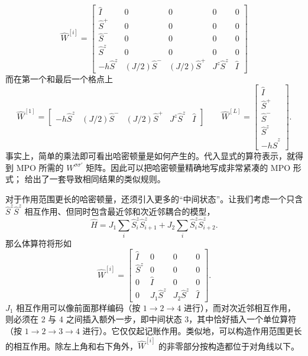 \documentclass[a4paper,10pt,oneside,onecolumn,1p,times]{elsarticle}
\begin{document}
\begin{equation}
\hat{W}^{[i]} = \left[
\begin{array}{ccccc}
\hat{I} & 0 & 0 & 0 & 0 \\
\hat{S}^+ & 0 & 0 & 0 & 0 \\
\hat{S}^- & 0 & 0 & 0 & 0 \\
\hat{S}^z & 0 & 0 & 0 & 0 \\
-h\hat{S}^z & (J/2)\hat{S}^- & (J/2)\hat{S}^+ & J^z\hat{S}^z & \hat{I}
\end{array}
\right]
\end{equation}
而在第一个和最后一个格点上
\begin{equation}
\hat{W}^{[1]} = \left[
\begin{array}{ccccc}
-h\hat{S}^z & (J/2)\hat{S}^- & (J/2)\hat{S}^+ & J^z\hat{S}^z & \hat{I} 
\end{array}
\right]
\quad\quad 
\hat{W}^{[L]} = \left[
\begin{array}{c}
\hat{I} \\ \hat{S}^+ \\ \hat{S}^- \\ \hat{S}^z \\ -h\hat{S}^z 
\end{array}
\right] .
\end{equation}
事实上，简单的乘法即可看出哈密顿量是如何产生的。代入显式的算符表示，就得到 MPO 所需的 $W^{\sigma\sigma'}$ 矩阵。因此可以把哈密顿量精确地写成非常紧凑的 MPO 形式；\cite{Crosswhite08a} 给出了一套导致相同结果的类似规则。

对于作用范围更长的哈密顿量，还须引入更多的``中间状态''。让我们考虑一个只含 $\hat{S}^z \hat{S}^z$ 相互作用、但同时包含最近邻和次近邻耦合的模型，
\begin{equation}
\hat{H} = J_1 \sum_{i} \hat{S}^z_i \hat{S}^z_{i+1} + J_2 \sum_{i} \hat{S}^z_i \hat{S}^z_{i+2} .
\end{equation}
那么体算符将形如
\begin{equation}
\hat{W}^{[i]} = \left[
\begin{array}{cccc}
\hat{I} & 0 & 0 & 0 \\
\hat{S}^z & 0 & 0 & 0 \\
0 & \hat{I} & 0 & 0 \\
0 & J_1\hat{S}^z & J_2\hat{S}^z & \hat{I}
\end{array}
\right] .
\end{equation}
$J_1$ 相互作用可以像前面那样编码（按 $1 \rightarrow 2 \rightarrow 4$ 进行），而对次近邻相互作用，则必须在 2 与 4 之间插入额外一步，即中间状态 3，其中恰好插入一个单位算符（按 $1 \rightarrow 2 \rightarrow 3 \rightarrow 4$ 进行）。它仅仅起记账作用。类似地，可以构造作用范围更长的相互作用。除左上角和右下角外，$\hat{W}^{[i]}$ 的非零部分按构造都位于对角线以下。
\end{document}
